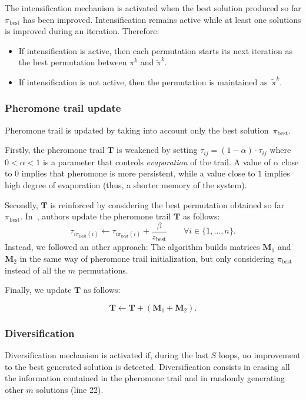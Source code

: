 The intensification mechanism is activated when the best solution produced so far $\pi_\mathrm{best}$  has been improved. Intensification remains active while at least one solutions is improved during an iteration. Therefore:
\begin{itemize}
	\item If intensification is active, then each permutation starts its next iteration as the best permutation between $\pi^k$ and $\tilde{\pi}^k$.
	\item If intensification is not active, then the permutation is maintained as~$\tilde{\pi}^k$.
\end{itemize}

\subsubsection{Pheromone trail update}
Pheromone trail is updated by taking into account only the best solution~$\pi_\mathrm{best}$. 

Firstly, the pheromone trail $\bm T$ is weakened by setting $\tau_{ij}= (1-\alpha)\cdot \tau_{ij}$ where $0<\alpha<1$ is a parameter that controls \textit{evaporation} of the trail. A value of $\alpha$ close to $0$ implies that pheromone is more persistent, while a value close to $1$ implies high degree of evaporation (thus, a shorter memory of the system).

Secondly, $\bm T$ is reinforced by considering the best permutation obtained so far $\pi_\mathrm{best}$. 
In~\cite{Gambardella1999}, authors update the pheromone trail $\bm T$ as follows: 
\begin{equation}
\tau_{i\pi_\mathrm{best}(i)} \gets \tau_{i \pi_\mathrm{best}(i)} + \frac{\beta}{z_\mathrm{best}} \qquad \forall i \in \{1,\dots,n\}.
\end{equation}
Instead, we followed an other approach: The algorithm builds matrices $\bm M_1$ and $\bm M_2$ in the same way of pheromone trail initialization, but only considering $\pi_\mathrm{best}$ instead of all the $m$ permutations.

 Finally, we update $\bm T$ as follows:
 
  \begin{equation}\bm T  \gets\bm T  + \left(\bm M_1 + \bm M_2 \right).
\end{equation}

\subsubsection{Diversification}
Diversification mechanism is activated if, during the last $S$ loops, no improvement to the best generated solution is detected.
Diversification consists in erasing all the information contained in the pheromone trail and in randomly generating other $m$ solutions (line 22).


